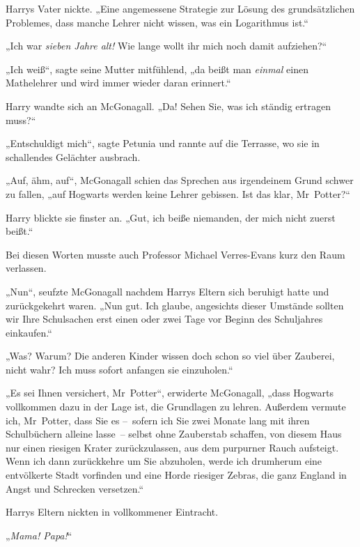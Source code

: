 Harrys Vater nickte. „Eine angemessene Strategie zur Lösung des grundsätzlichen Problemes, dass manche Lehrer nicht wissen, was ein Logarithmus ist.“

„Ich war \emph{sieben Jahre alt!} Wie lange wollt ihr mich noch damit aufziehen?“

„Ich weiß“, sagte seine Mutter mitfühlend, „da beißt man \emph{einmal} einen Mathelehrer und wird immer wieder daran erinnert.“

Harry wandte sich an McGonagall. „Da! Sehen Sie, was ich ständig ertragen muss?“

„Entschuldigt mich“, sagte Petunia und rannte auf die Terrasse, wo sie in schallendes Gelächter ausbrach.

„Auf, ähm, auf“, McGonagall schien das Sprechen aus irgendeinem Grund schwer zu fallen, „auf Hogwarts werden keine Lehrer gebissen. Ist das klar, Mr~Potter?“

Harry blickte sie finster an. „Gut, ich beiße niemanden, der mich nicht zuerst beißt.“

Bei diesen Worten musste auch Professor Michael Verres-Evans kurz den Raum verlassen.

„Nun“, seufzte McGonagall nachdem Harrys Eltern sich beruhigt hatte und zurückgekehrt waren. „Nun gut. Ich glaube, angesichts dieser Umstände sollten wir Ihre Schulsachen erst einen oder zwei Tage vor Beginn des Schuljahres einkaufen.“

„Was? Warum? Die anderen Kinder wissen doch schon so viel über Zauberei, nicht wahr? Ich muss sofort anfangen sie einzuholen.“

„Es sei Ihnen versichert, Mr~Potter“, erwiderte McGonagall, „dass Hogwarts vollkommen dazu in der Lage ist, die Grundlagen zu lehren. Außerdem vermute ich, Mr~Potter, dass Sie es – sofern ich Sie zwei Monate lang mit ihren Schulbüchern alleine lasse – selbst ohne Zauberstab schaffen, von diesem Haus nur einen riesigen Krater zurückzulassen, aus dem purpurner Rauch aufsteigt. Wenn ich dann zurückkehre um Sie abzuholen, werde ich drumherum eine entvölkerte Stadt vorfinden und eine Horde riesiger Zebras, die ganz England in Angst und Schrecken versetzen.“

Harrys Eltern nickten in vollkommener Eintracht.

„\emph{Mama! Papa!}“
